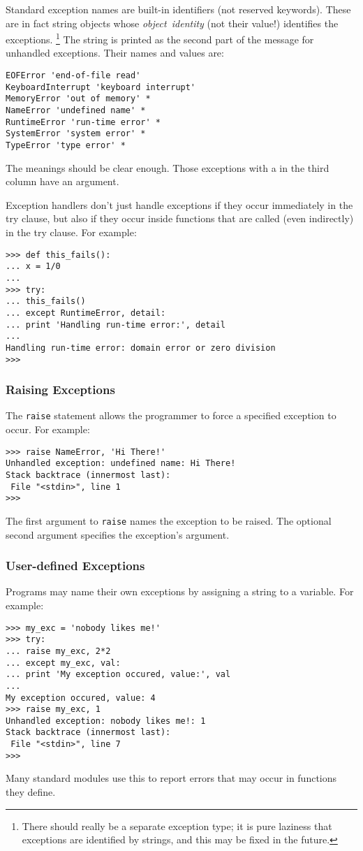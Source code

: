 Standard exception names are built-in identifiers (not reserved
keywords).
These are in fact string objects whose
{\em object\ identity}
(not their value!) identifies the exceptions.%
\footnote{
 There should really be a separate exception type; it is pure
 laziness that exceptions are identified by strings, and this may
 be fixed in the future.
}
The string is printed as the second part of the message for unhandled
exceptions.
Their names and values are:
\bcode\begin{verbatim}
EOFError 'end-of-file read'
KeyboardInterrupt 'keyboard interrupt'
MemoryError 'out of memory' *
NameError 'undefined name' *
RuntimeError 'run-time error' *
SystemError 'system error' *
TypeError 'type error' *
\end{verbatim}\ecode
The meanings should be clear enough.
Those exceptions with a {\tt *} in the third column have an argument.

Exception handlers don't just handle exceptions if they occur
immediately in the try clause, but also if they occur inside functions
that are called (even indirectly) in the try clause.
For example:
\bcode\begin{verbatim}
>>> def this_fails():
... x = 1/0
...
>>> try:
... this_fails()
... except RuntimeError, detail:
... print 'Handling run-time error:', detail
...
Handling run-time error: domain error or zero division
>>>
\end{verbatim}\ecode

\subsubsection{Raising Exceptions}

The {\tt raise} statement allows the programmer to force a specified
exception to occur.
For example:
\bcode\begin{verbatim}
>>> raise NameError, 'Hi There!'
Unhandled exception: undefined name: Hi There!
Stack backtrace (innermost last):
 File "<stdin>", line 1
>>>
\end{verbatim}\ecode
The first argument to {\tt raise} names the exception to be raised.
The optional second argument specifies the exception's argument.

\subsubsection{User-defined Exceptions}

Programs may name their own exceptions by assigning a string to a
variable.
For example:
\bcode\begin{verbatim}
>>> my_exc = 'nobody likes me!'
>>> try:
... raise my_exc, 2*2
... except my_exc, val:
... print 'My exception occured, value:', val
...
My exception occured, value: 4
>>> raise my_exc, 1
Unhandled exception: nobody likes me!: 1
Stack backtrace (innermost last):
 File "<stdin>", line 7
>>>
\end{verbatim}\ecode
Many standard modules use this to report errors that may occur in
functions they define.

